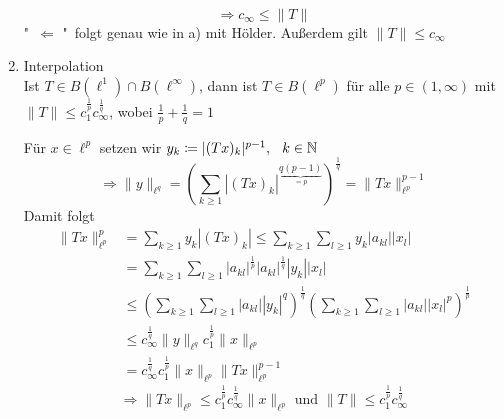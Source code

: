 \begin{beispiel}[Matrizenmultiplikation]
\begin{enumerate}[label=\alph*\upshape)]
\begin{beweis}
\begin{align*}
			\end{align*}			
			\[ \Rightarrow c_{\infty} \leq \| T \| \]
			"\ $\Leftarrow$ "\ folgt genau wie in a) mit Hölder. Au{\ss}erdem gilt $\| T \| \leq c_{\infty}$ 
		\end{beweis}
	\item Interpolation \\
		Ist $T \in B(\ell^{1}) \cap B(\ell^{\infty})$, dann ist $T \in B(\ell^{p})$ für alle $p \in (1, \infty)$ mit $\| T \| \leq c_{1}^{\frac{1}{p}} c_{\infty}^{\frac{1}{q}}$, wobei $\frac{1}{p} + \frac{1}{q} = 1$
		\begin{beweis}
		 Für $x \in \ell^{p}$ setzen wir $y_{k} \coloneqq |(T x)_{k}|^{p - 1}, \hspace{0.25cm} k \in \mathbb{N}$ \\
		 \[ \Rightarrow \| y \|_{\ell^{q}} = \left( \sum_{k \geq 1} \left| \left( Tx \right)_{k} \right|^{\underbrace{q(p-1)}_{= p}}  \right)^\frac{1}{q} = \| Tx \|_{\ell^{p}}^{p - 1} \]	
		 Damit folgt
		 \begin{align*}
		 	\| Tx \|_{\ell^{p}}^{p} & = \sum_{k \geq 1 } y_{k} | (Tx)_{k} | \leq \sum_{k \geq 1} \sum_{l \geq 1} y_{k} |a_{kl}| |x_{l}| \\
		 	& = \sum_{k \geq 1} \sum_{l \geq 1} |a_{kl}|^{\frac{1}{p}} |a_{kl}|^{\frac{1}{q}} |y_{k}| |x_{l}| \\
		 	& \leq \left( \sum_{k \geq 1} \sum_{l \geq 1} |a_{kl}| |y_{k}|^{q} \right)^{\frac{1}{q}} \left( \sum_{k \geq 1} \sum_{l \geq 1} |a_{kl}| |x_{l}|^p \right)^{\frac{1}{p}} \\
		 	& \leq c_{\infty}^{\frac{1}{q}} \| y \|_{\ell^{q}} c_{1}^{\frac{1}{p}} \| x \|_{\ell^{p}} \\
		 	& =  c_{\infty}^{\frac{1}{q}} c_{1}^{\frac{1}{p}}  \| x \|_{\ell^{p}} \| Tx \|_{\ell^{p}}^{p - 1} 
		 \end{align*}
		 \[ \Rightarrow \| Tx \|_{\ell^{p}} \leq c_{1}^{\frac{1}{p}} c_{\infty}^{\frac{1}{q}} \| x \|_{\ell^{p}} \text{ und } \| T\| \leq c_{1}^{\frac{1}{p}} c_{\infty}^{\frac{1}{q}} \]
		\end{beweis}
 \end{enumerate}
\end{beispiel}

